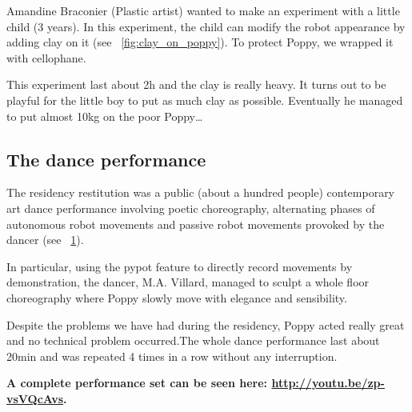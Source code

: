 Amandine Braconier (Plastic artist) wanted to make an experiment with a little child (3 years). In this experiment, the child can modify the robot appearance by adding clay on it (see \figurename~\ref{fig:clay_on_poppy}). To protect Poppy, we wrapped it with cellophane.

This experiment last about 2h and the clay is really heavy. It turns out to be playful for the little boy to put as much clay as possible. Eventually he managed to put almost 10kg on the poor Poppy\dots

\begin{NFfigure}
\centering
    \hfil
    \caption{}
    \label{fig:clay_on_poppy}
\end{NFfigure}


\subsection{The dance performance} %

The residency restitution was a public (about a hundred people) contemporary art dance performance involving poetic choreography, alternating phases of autonomous robot movements and passive robot movements provoked by the dancer (see \figurename~\ref{fig:poppy_dance_performance}).

In particular, using the pypot feature to directly record movements by demonstration, the dancer, M.A. Villard, managed to sculpt a whole floor choreography where Poppy slowly move with elegance and sensibility.

Despite the problems we have had during the residency, Poppy acted really great and no technical problem occurred.The whole dance performance last about 20min and was repeated 4 times in a row without any interruption.

\textbf{A complete performance set can be seen here: \url{http://youtu.be/zp-vsVQcAvs}.}

\begin{figure}[]
\centering
    \hfil
    \\
    \hfil
    \\
    \caption{}
    \label{fig:poppy_dance_performance}
\end{figure}




